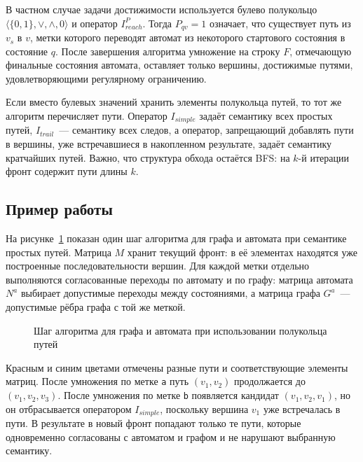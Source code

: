 В частном случае задачи достижимости используется булево полукольцо $\langle \{0,1\}, \vee, \wedge, 0 \rangle$ и оператор $I^P_{\mathit{reach}}$.
Тогда $P_{qv} = 1$ означает, что существует путь из $v_s$ в $v$, метки которого переводят автомат из некоторого стартового состояния в состояние $q$.
После завершения алгоритма умножение на строку $F$, отмечающую финальные состояния автомата, оставляет только вершины, достижимые путями, удовлетворяющими регулярному ограничению.

Если вместо булевых значений хранить элементы полукольца путей, то тот же алгоритм перечисляет пути.
Оператор $I_{\mathit{simple}}$ задаёт семантику всех простых путей, $I_{\mathit{trail}}$~--- семантику всех следов, а оператор, запрещающий добавлять пути в вершины, уже встречавшиеся в накопленном результате, задаёт семантику кратчайших путей.
Важно, что структура обхода остаётся BFS: на $k$-й итерации фронт содержит пути длины $k$.

\subsection{Пример работы}
\label{subsec:RPQ_BFS_example}

На рисунке~\ref{fig:RPQ_BFS_algorithm_step} показан один шаг алгоритма для графа и автомата при семантике простых путей.
Матрица $M$ хранит текущий фронт: в её элементах находятся уже построенные последовательности вершин.
Для каждой метки отдельно выполняются согласованные переходы по автомату и по графу: матрица автомата $N^a$ выбирает допустимые переходы между состояниями, а матрица графа $G^a$~--- допустимые рёбра графа с той же меткой.

\begin{figure}
    \centering
    
    \caption{Шаг алгоритма для графа и автомата при использовании полукольца путей}
    \label{fig:RPQ_BFS_algorithm_step}
\end{figure}

Красным и синим цветами отмечены разные пути и соответствующие элементы матриц.
После умножения по метке \texttt{a} путь $(v_1, v_2)$ продолжается до $(v_1, v_2, v_3)$.
После умножения по метке \texttt{b} появляется кандидат $(v_1, v_2, v_1)$, но он отбрасывается оператором $I_{\mathit{simple}}$, поскольку вершина $v_1$ уже встречалась в пути.
В результате в новый фронт попадают только те пути, которые одновременно согласованы с автоматом и графом и не нарушают выбранную семантику.

